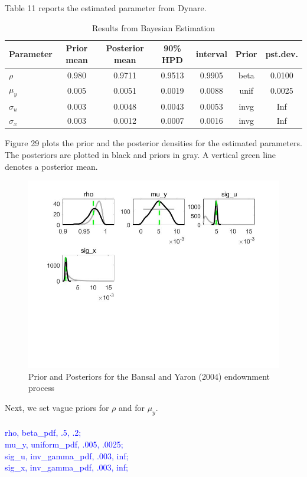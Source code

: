 \documentclass[a4paper,12pt]{scrartcl} %
\begin{document}
Table 11 reports the estimated parameter from Dynare.

\begin{table}
\centering
\caption{Results from Bayesian Estimation}\label{11}
\begin{tabular}{lcccccc}
\hline
Parameter&Prior mean&Posterior mean&90\% HPD&interval&Prior&pst.dev.\\
\hline
$\rho$&0.980&0.9711&0.9513&0.9905&beta&0.0100\\
$\mu_y$&0.005&0.0051&0.0019&0.0088&unif&0.0025\\
$\sigma_u$&0.003&0.0048&0.0043&0.0053&invg&Inf\\
$\sigma_x$&0.003&0.0012&0.0007&0.0016&invg&Inf\\
\hline
\end{tabular}
\end{table}


Figure 29 plots the prior and the posterior densities for the estimated parameters. The posteriors are plotted in black and priors in gray. A vertical green line denotes a posterior mean.

\begin{figure}[htbp!]
		\centering
			\includegraphics[width=0.8\linewidth]{fig30.jpg}
            \caption{Prior and Posteriors for the Bansal and Yaron (2004) endownment process}\label{30}
\end{figure}

Next, we set vague priors for $\rho$ and for $\mu_y$.\\
\\
\textcolor{blue}{
rho, beta\_pdf, .5, .2;\\
mu\_y, uniform\_pdf, .005, .0025;\\
sig\_u, inv\_gamma\_pdf, .003, inf;\\
sig\_x, inv\_gamma\_pdf, .003, inf;}\\
\end{document}
